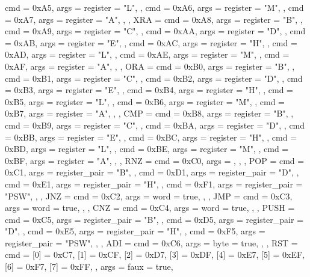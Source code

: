 {{        { cmd = 0xA5, args = {{register = "L"}}, },
        { cmd = 0xA6, args = {{register = "M"}}, },
        { cmd = 0xA7, args = {{register = "A"}}, },
    },
    XRA  = {
        { cmd = 0xA8, args = {{register = "B"}}, },
        { cmd = 0xA9, args = {{register = "C"}}, },
        { cmd = 0xAA, args = {{register = "D"}}, },
        { cmd = 0xAB, args = {{register = "E"}}, },
        { cmd = 0xAC, args = {{register = "H"}}, },
        { cmd = 0xAD, args = {{register = "L"}}, },
        { cmd = 0xAE, args = {{register = "M"}}, },
        { cmd = 0xAF, args = {{register = "A"}}, },
    },
    ORA  = {
        { cmd = 0xB0, args = {{register = "B"}}, },
        { cmd = 0xB1, args = {{register = "C"}}, },
        { cmd = 0xB2, args = {{register = "D"}}, },
        { cmd = 0xB3, args = {{register = "E"}}, },
        { cmd = 0xB4, args = {{register = "H"}}, },
        { cmd = 0xB5, args = {{register = "L"}}, },
        { cmd = 0xB6, args = {{register = "M"}}, },
        { cmd = 0xB7, args = {{register = "A"}}, },
    },
    CMP  = {
        { cmd = 0xB8, args = {{register = "B"}}, },
        { cmd = 0xB9, args = {{register = "C"}}, },
        { cmd = 0xBA, args = {{register = "D"}}, },
        { cmd = 0xBB, args = {{register = "E"}}, },
        { cmd = 0xBC, args = {{register = "H"}}, },
        { cmd = 0xBD, args = {{register = "L"}}, },
        { cmd = 0xBE, args = {{register = "M"}}, },
        { cmd = 0xBF, args = {{register = "A"}}, },
    },
    RNZ  = {
        { cmd = 0xC0, args = {}, },
    },
    POP  = {
        { cmd = 0xC1, args = {{register_pair = "B"}}, },
        { cmd = 0xD1, args = {{register_pair = "D"}}, },
        { cmd = 0xE1, args = {{register_pair = "H"}}, },
        { cmd = 0xF1, args = {{register_pair = "PSW"}}, },
    },
    JNZ  = {
        { cmd = 0xC2, args = {{word = true}}, },
    },
    JMP  = {
        { cmd = 0xC3, args = {{word = true}}, },
    },
    CNZ  = {
        { cmd = 0xC4, args = {{word = true}}, },
    },
    PUSH = {
        { cmd = 0xC5, args = {{register_pair = "B"}}, },
        { cmd = 0xD5, args = {{register_pair = "D"}}, },
        { cmd = 0xE5, args = {{register_pair = "H"}}, },
        { cmd = 0xF5, args = {{register_pair = "PSW"}}, },
    },
    ADI  = {
        { cmd = 0xC6, args = {{byte = true}}, },
    },
    RST  = {
        {
            cmd = {
                [0] = 0xC7,
                [1] = 0xCF,
                [2] = 0xD7,
                [3] = 0xDF,
                [4] = 0xE7,
                [5] = 0xEF,
                [6] = 0xF7,
                [7] = 0xFF,
            },
            args = {{faux = true}},
}}}
